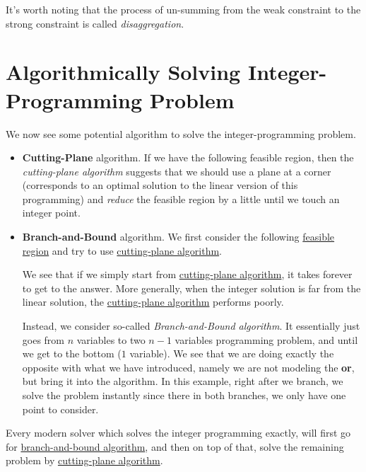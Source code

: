 \begin{note}[Disaggregation]
	It's worth noting that the process of un-summing from the weak constraint to the strong constraint is called \emph{disaggregation}.
\end{note}

\section{Algorithmically Solving Integer-Programming Problem}
We now see some potential algorithm to solve the integer-programming problem.
\begin{itemize}
	\item \label{eg:cutting-plane}\textbf{Cutting-Plane} algorithm. If we have the following feasible region, then the \emph{cutting-plane algorithm} suggests
	      that we should use a plane at a corner (corresponds to an optimal solution to the linear version of this programming) and
	      \emph{reduce} the feasible region by a little until we touch an integer point.
	      \begin{figure}[H]
		      \centering
		      \label{fig:integer-programming-cutting-plane}
	      \end{figure}
	\item \label{eg:branch-and-bound}\textbf{Branch-and-Bound} algorithm. We first consider the following \hyperref[def:feasible-region]{feasible region}
	      and try to use \hyperref[eg:cutting-plane]{cutting-plane algorithm}.
	      \begin{figure}[H]
		      \centering
		      \label{fig:integer-programming-branch-and-bound}
	      \end{figure}
	      We see that if we simply start from \hyperref[eg:cutting-plane]{cutting-plane algorithm}, it takes forever to get to the answer. More generally, when the
	      integer solution is far from the linear solution, the \hyperref[eg:cutting-plane]{cutting-plane algorithm} performs poorly.

	      \par Instead, we consider so-called \emph{Branch-and-Bound algorithm}. It essentially just goes from \(n\) variables to two \(n-1\) variables
	      programming problem, and until we get to the bottom (\(1\) variable). We see that we are doing exactly the opposite with what we have
	      introduced, namely we are not modeling the \textbf{or}, but bring it into the algorithm. In this example, right after we branch,
	      we solve the problem instantly since there in both branches, we only have one point to consider.
\end{itemize}
\begin{note}
	Every modern solver which solves the integer programming exactly, will first go for \hyperref[eg:branch-and-bound]{branch-and-bound algorithm}, and then on top
	of that, solve the remaining problem by \hyperref[eg:cutting-plane]{cutting-plane algorithm}.
\end{note}